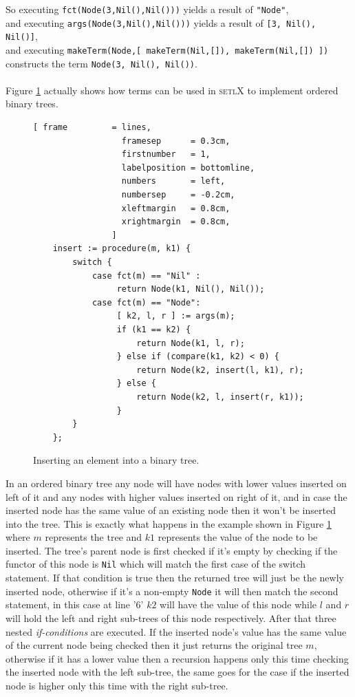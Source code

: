 \documentclass[11pt]{report}
\begin{document}
So executing \texttt{fct(Node(3,Nil(),Nil()))} yields a result of \texttt{"Node"},\\
and executing \texttt{args(Node(3,Nil(),Nil()))} yields a result of \texttt{[3, Nil(), Nil()]},\\
and executing \texttt{makeTerm(Node,[ makeTerm(Nil,[]), makeTerm(Nil,[]) ])} constructs the term \texttt{Node(3, Nil(), Nil())}.
\\
\\
Figure \ref{fig:binary-tree-no-matching.stlx} actually shows how terms can be used in \textsc{setlX} to implement ordered binary trees.
\pagebreak
\begin{figure}[!ht]
\centering
\begin{Verbatim}[ frame         = lines, 
                  framesep      = 0.3cm, 
                  firstnumber   = 1,
                  labelposition = bottomline,
                  numbers       = left,
                  numbersep     = -0.2cm,
                  xleftmargin   = 0.8cm,
                  xrightmargin  = 0.8cm,
                ]
    insert := procedure(m, k1) {
        switch {
            case fct(m) == "Nil" : 
                 return Node(k1, Nil(), Nil());
            case fct(m) == "Node": 
                 [ k2, l, r ] := args(m);
                 if (k1 == k2) {
                     return Node(k1, l, r);
                 } else if (compare(k1, k2) < 0) { 
                     return Node(k2, insert(l, k1), r);
                 } else {
                     return Node(k2, l, insert(r, k1));
                 }
        }
    };
\end{Verbatim}
\vspace*{-0.3cm}
\caption{Inserting an element into a binary tree.}
\label{fig:binary-tree-no-matching.stlx}
\end{figure}

In an ordered binary tree any node will have nodes with lower values inserted on left of it and any nodes with higher values inserted on right of it, and in case the inserted node has the same value of an existing node then it won't be inserted into the tree. This is exactly what happens in the example shown in Figure \ref{fig:binary-tree-no-matching.stlx} where $m$ represents the tree and $k1$ represents the value of the node to be inserted. The tree's parent node is first checked if it's empty by checking if the functor of this node is \texttt{Nil} which will match the first case of the switch statement. If that condition is true then the returned tree will just be the newly inserted node, otherwise if it's a non-empty \texttt{Node} it will then match the second statement, in this case at line '$6$' $k2$ will have the value of this node while $l$ and $r$ will hold the left and right sub-trees of this node respectively. After that three nested \textsl{if-conditions} are executed. If the inserted node's value has the same value of the current node being checked then it just returns the original tree $m$, otherwise if it has a lower value then a recursion happens only this time checking the inserted node with the left sub-tree, the same goes for the case if the inserted node is higher only this time with the right sub-tree. 
\end{document}
